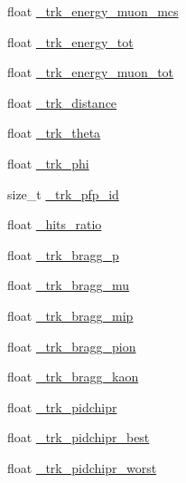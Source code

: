 \begin{DoxyCompactItemize}
float \hyperlink{classselection_1_1CC0piNpSelection_a4ae8946bcc37ce152c81ba3c28d60fbb}{\+\_\+trk\+\_\+energy\+\_\+muon\+\_\+mcs}
\item 
float \hyperlink{classselection_1_1CC0piNpSelection_a8a0da0081e2f182880249debba6551e3}{\+\_\+trk\+\_\+energy\+\_\+tot}
\item 
float \hyperlink{classselection_1_1CC0piNpSelection_aebac9c09110d469f5d7ed3817c33e437}{\+\_\+trk\+\_\+energy\+\_\+muon\+\_\+tot}
\item 
float \hyperlink{classselection_1_1CC0piNpSelection_a0f16777192fbed04bcc67edfdfa67e6b}{\+\_\+trk\+\_\+distance}
\item 
float \hyperlink{classselection_1_1CC0piNpSelection_a08cd38de74e9611829a3580a310c19f2}{\+\_\+trk\+\_\+theta}
\item 
float \hyperlink{classselection_1_1CC0piNpSelection_a85a6029e249e3ff20ea6d8eaabf22142}{\+\_\+trk\+\_\+phi}
\item 
size\+\_\+t \hyperlink{classselection_1_1CC0piNpSelection_a641e7e656a28a5b31a5c8ab21dad9d3b}{\+\_\+trk\+\_\+pfp\+\_\+id}
\item 
float \hyperlink{classselection_1_1CC0piNpSelection_a32b43003c9168115bc94544049e439a2}{\+\_\+hits\+\_\+ratio}
\item 
float \hyperlink{classselection_1_1CC0piNpSelection_a52d578481ee7dd4fed45f8e3c8ed44da}{\+\_\+trk\+\_\+bragg\+\_\+p}
\item 
float \hyperlink{classselection_1_1CC0piNpSelection_a9e7b081beb0ef9129f15a7fb965276f1}{\+\_\+trk\+\_\+bragg\+\_\+mu}
\item 
float \hyperlink{classselection_1_1CC0piNpSelection_aec1e4d27216773ec40bc66ab5c217abc}{\+\_\+trk\+\_\+bragg\+\_\+mip}
\item 
float \hyperlink{classselection_1_1CC0piNpSelection_a5371981bb5f02024c2ba1d986541ffd9}{\+\_\+trk\+\_\+bragg\+\_\+pion}
\item 
float \hyperlink{classselection_1_1CC0piNpSelection_ac9b23583581239191762cfb60307fb78}{\+\_\+trk\+\_\+bragg\+\_\+kaon}
\item 
float \hyperlink{classselection_1_1CC0piNpSelection_a712eaf6dc6086f1be5705a3bbe5226fc}{\+\_\+trk\+\_\+pidchipr}
\item 
float \hyperlink{classselection_1_1CC0piNpSelection_aaf0a2841494bc52da55d267bc3c8db3d}{\+\_\+trk\+\_\+pidchipr\+\_\+best}
\item 
float \hyperlink{classselection_1_1CC0piNpSelection_a6c06ff43f89cbee19cf466b830a6fe38}{\+\_\+trk\+\_\+pidchipr\+\_\+worst}
\item 

\end{DoxyCompactItemize}
